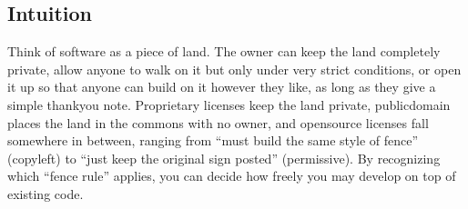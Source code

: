 \documentclass[12pt, a4paper]{article}
\begin{document}
\subsection{Intuition}
Think of software as a piece of land. The owner can keep the land completely private, allow anyone to walk on it but only under very strict conditions, or open it up so that anyone can build on it however they like, as long as they give a simple thankyou note. Proprietary licenses keep the land private, publicdomain places the land in the commons with no owner, and opensource licenses fall somewhere in between, ranging from ``must build the same style of fence'' (copyleft) to ``just keep the original sign posted'' (permissive). By recognizing which ``fence rule'' applies, you can decide how freely you may develop on top of existing code.
\end{document}
